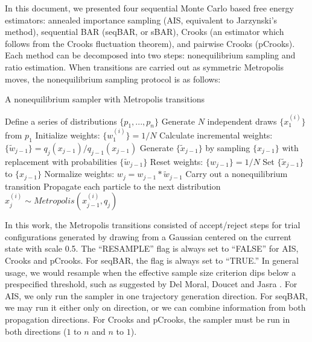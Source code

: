 In this document, we presented four sequential Monte Carlo based free energy estimators: annealed importance sampling (AIS, equivalent to Jarzynski's method), sequential BAR (seqBAR, or sBAR), Crooks (an estimator which follows from the Crooks fluctuation theorem), and pairwise Crooks (pCrooks).
Each method can be decomposed into two steps: nonequilibrium sampling and ratio estimation.
When transitions are carried out as symmetric Metropolis moves, the nonequilibrium sampling protocol is as follows:

\begin{algorithm}
\caption{A nonequilibrium sampler with Metropolis transitions}
\begin{algorithmic}[1]
    \STATE Define a series of distributions $\{p_1, ..., p_n\}$
    \STATE Generate $N$ independent draws $\{x_1^{(i)}\}$ from $p_1$
    \STATE Initialize weights: $\{w_1^{(i)}\}=1/N$
        \STATE Calculate incremental weights: $\{\tilde{w}_{j-1}\} = q_j(x_{j-1})/q_{j-1}(x_{j-1})$
            \STATE Generate $\{ \tilde{x}_{j-1} \}$ by sampling $\{ x_{j-1} \}$ with replacement with probabilities $\{\tilde{w}_{j-1}\}$
            \STATE Reset weights: $\{ w_{j-1} \} = 1/N$
        \ELSE
            \STATE Set $\{ \tilde{x}_{j-1} \}$ to $\{ x_{j-1} \}$
        \ENDIF
        \STATE Normalize weights: $w_j = w_{j-1}*\tilde{w}_{j-1}$
        \STATE Carry out a nonequilibrium transition
            \STATE Propagate each particle to the next distribution
            \STATE $x_j^{(i)} \sim Metropolis(x_{j-1}^{(i)}, q_j)$
        \ENDFOR
    \ENDFOR
\end{algorithmic}
\end{algorithm}

In this work, the Metropolis transitions consisted of accept/reject steps for trial configurations generated by drawing from a Gaussian centered on the current state with scale 0.5.
The ``RESAMPLE'' flag is always set to ``FALSE'' for AIS, Crooks and pCrooks. 
For seqBAR, the flag is always set to ``TRUE.'' 
In general usage, we would resample when the effective sample size criterion dips below a prespecified threshold, such as suggested by Del Moral, Doucet and Jasra \cite{del2006sequential}.
For AIS, we only run the sampler in one trajectory generation direction. 
For seqBAR, we may run it either only on direction, or we can combine information from both propagation directions.
For Crooks and pCrooks, the sampler must be run in both directions ($1$ to $n$ and $n$ to $1$).

